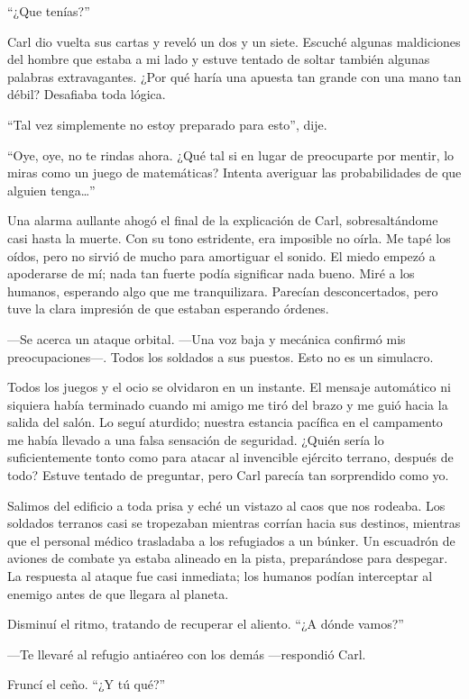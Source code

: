 ``¿Que tenías?''


Carl dio vuelta sus cartas y reveló un dos y un siete. Escuché algunas maldiciones del hombre que estaba a mi lado y estuve tentado de soltar también algunas palabras extravagantes. ¿Por qué haría una apuesta tan grande con una mano tan débil? Desafiaba toda lógica.

``Tal vez simplemente no estoy preparado para esto'', dije.

``Oye, oye, no te rindas ahora. ¿Qué tal si en lugar de preocuparte por mentir, lo miras como un juego de matemáticas? Intenta averiguar las probabilidades de que alguien tenga…''


Una alarma aullante ahogó el final de la explicación de Carl, sobresaltándome casi hasta la muerte. Con su tono estridente, era imposible no oírla. Me tapé los oídos, pero no sirvió de mucho para amortiguar el sonido. El miedo empezó a apoderarse de mí; nada tan fuerte podía significar nada bueno. Miré a los humanos, esperando algo que me tranquilizara. Parecían desconcertados, pero tuve la clara impresión de que estaban esperando órdenes.

—Se acerca un ataque orbital. —Una voz baja y mecánica confirmó mis preocupaciones—. Todos los soldados a sus puestos. Esto no es un simulacro.

Todos los juegos y el ocio se olvidaron en un instante. El mensaje automático ni siquiera había terminado cuando mi amigo me tiró del brazo y me guió hacia la salida del salón. Lo seguí aturdido; nuestra estancia pacífica en el campamento me había llevado a una falsa sensación de seguridad. ¿Quién sería lo suficientemente tonto como para atacar al invencible ejército terrano, después de todo? Estuve tentado de preguntar, pero Carl parecía tan sorprendido como yo.

Salimos del edificio a toda prisa y eché un vistazo al caos que nos rodeaba. Los soldados terranos casi se tropezaban mientras corrían hacia sus destinos, mientras que el personal médico trasladaba a los refugiados a un búnker. Un escuadrón de aviones de combate ya estaba alineado en la pista, preparándose para despegar. La respuesta al ataque fue casi inmediata; los humanos podían interceptar al enemigo antes de que llegara al planeta.

Disminuí el ritmo, tratando de recuperar el aliento. ``¿A dónde vamos?''


—Te llevaré al refugio antiaéreo con los demás —respondió Carl.

Fruncí el ceño. ``¿Y tú qué?''


